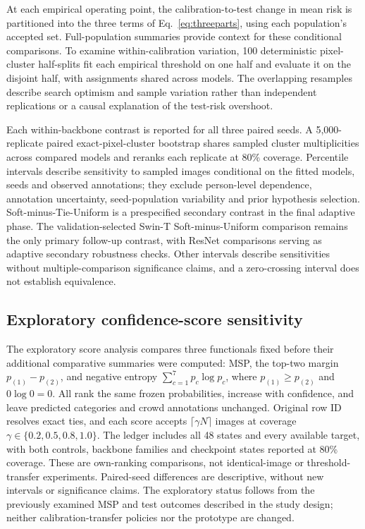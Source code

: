 \documentclass[pdflatex,sn-mathphys-num]{sn-jnl}
\begin{document}
At each empirical operating point, the calibration-to-test change in mean risk is partitioned into the three terms of Eq.~\ref{eq:threeparts}, using each population's accepted set. Full-population summaries provide context for these conditional comparisons. To examine within-calibration variation, 100 deterministic pixel-cluster half-splits fit each empirical threshold on one half and evaluate it on the disjoint half, with assignments shared across models. The overlapping resamples describe search optimism and sample variation rather than independent replications or a causal explanation of the test-risk overshoot.

Each within-backbone contrast is reported for all three paired seeds. A 5,000-replicate paired exact-pixel-cluster bootstrap shares sampled cluster multiplicities across compared models and reranks each replicate at 80\% coverage. Percentile intervals describe sensitivity to sampled images conditional on the fitted models, seeds and observed annotations; they exclude person-level dependence, annotation uncertainty, seed-population variability and prior hypothesis selection. Soft-minus-Tie-Uniform is a prespecified secondary contrast in the final adaptive phase. The validation-selected Swin-T Soft-minus-Uniform comparison remains the only primary follow-up contrast, with ResNet comparisons serving as adaptive secondary robustness checks. Other intervals describe sensitivities without multiple-comparison significance claims, and a zero-crossing interval does not establish equivalence.


\subsection{Exploratory confidence-score sensitivity}
The exploratory score analysis compares three functionals fixed before their additional comparative summaries were computed: MSP, the top-two margin $p_{(1)}-p_{(2)}$, and negative entropy $\sum_{c=1}^{7}p_c\log p_c$, where $p_{(1)}\geq p_{(2)}$ and $0\log0=0$. All rank the same frozen probabilities, increase with confidence, and leave predicted categories and crowd annotations unchanged. Original row ID resolves exact ties, and each score accepts $\lceil\gamma N\rceil$ images at coverage $\gamma\in\{0.2,0.5,0.8,1.0\}$. The ledger includes all 48 states and every available target, with both controls, backbone families and checkpoint states reported at 80\% coverage. These are own-ranking comparisons, not identical-image or threshold-transfer experiments. Paired-seed differences are descriptive, without new intervals or significance claims. The exploratory status follows from the previously examined MSP and test outcomes described in the study design; neither calibration-transfer policies nor the prototype are changed.
\end{document}
